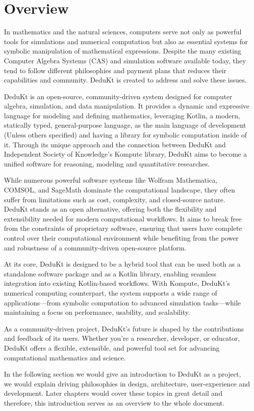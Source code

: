 \section{Overview}\label{sec:overview}
In mathematics and the natural sciences, computers serve not only as powerful tools for simulations and numerical computation but also as essential systems for symbolic manipulation of mathematical expressions.
Despite the many existing Computer Algebra Systems (CAS) and simulation software available today, they tend to follow different philosophies and payment plans that reduces their capabilities and community.
DeduKt is created to address and solve these issues.

DeduKt is an open-source, community-driven system designed for computer algebra, simulation, and data manipulation.
It provides a dynamic and expressive language for modeling and defining mathematics, leveraging Kotlin, a modern, statically typed, general-purpose language, as the main language of development (Unless others specified) and having a library for symbolic computation inside of it.
Through its unique approach and the connection between DeduKt and Independent Society of Knowledge's Kompute library, DeduKt aims to become a unified software for reasoning, modeling and quantitative researches.

While numerous powerful software systems like Wolfram Mathematica, COMSOL, and SageMath dominate the computational landscape, they often suffer from limitations such as cost, complexity, and closed-source nature.
DeduKt stands as an open alternative, offering both the flexibility and extensibility needed for modern computational workflows.
It aims to break free from the constraints of proprietary software, ensuring that users have complete control over their computational environment while benefiting from the power and robustness of a community-driven open-source platform.

At its core, DeduKt is designed to be a hybrid tool that can be used both as a standalone software package and as a Kotlin library, enabling seamless integration into existing Kotlin-based workflows.
With Kompute, DeduKt's numerical computing counterpart, the system supports a wide range of applications—from symbolic computation to advanced simulation tasks—while maintaining a focus on performance, usability, and scalability.

As a community-driven project, DeduKt's future is shaped by the contributions and feedback of its users.
Whether you're a researcher, developer, or educator, DeduKt offers a flexible, extensible, and powerful tool set for advancing computational mathematics and science.

In the following section we would give an introduction to DeduKt as a project, we would explain driving philosophies in design, architecture, user-experience and development.
Later chapters would cover these topics in great detail and therefore, this introduction serves as an overview to the whole document.
